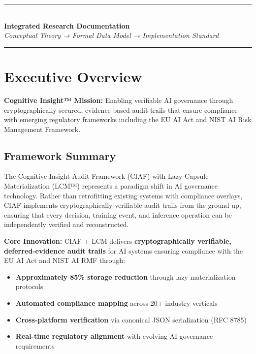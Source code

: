 \documentclass[12pt,a4paper]{article}
\begin{document}
\begin{titlepage}
\vfill

\begin{center}
\textcolor{ciafgray}{\rule{0.8\textwidth}{0.4pt}}\\
\vspace{0.5cm}
\textbf{\large Integrated Research Documentation}\\
\vspace{0.3cm}
\textit{Conceptual Theory → Formal Data Model → Implementation Standard}\\
\vspace{0.5cm}
\textcolor{ciafgray}{\rule{0.8\textwidth}{0.4pt}}
\end{center}

\vfill
\end{titlepage}

\tableofcontents
\newpage

\section{Executive Overview}

\begin{executivebox}
\textbf{Cognitive Insight™ Mission:} Enabling verifiable AI governance through cryptographically secured, evidence-based audit trails that ensure compliance with emerging regulatory frameworks including the EU AI Act and NIST AI Risk Management Framework.
\end{executivebox}

\subsection{Framework Summary}

The Cognitive Insight Audit Framework (CIAF) with Lazy Capsule Materialization (LCM™) represents a paradigm shift in AI governance technology. Rather than retrofitting existing systems with compliance overlays, CIAF implements cryptographically verifiable audit trails from the ground up, ensuring that every decision, training event, and inference operation can be independently verified and reconstructed.

\textbf{Core Innovation:} CIAF + LCM delivers \textbf{cryptographically verifiable, deferred-evidence audit trails} for AI systems ensuring compliance with the EU AI Act and NIST AI RMF through:

\begin{itemize}
\item \textbf{Approximately 85\% storage reduction} through lazy materialization protocols
\item \textbf{Automated compliance mapping} across 20+ industry verticals
\item \textbf{Cross-platform verification} via canonical JSON serialization (RFC 8785)
\item \textbf{Real-time regulatory alignment} with evolving AI governance requirements
\end{itemize}
\end{document}
